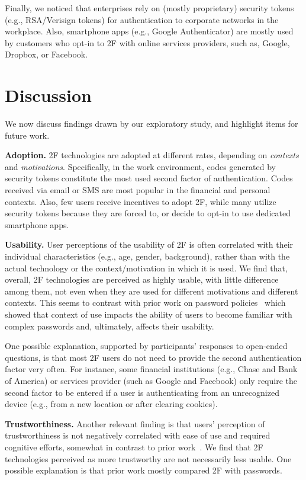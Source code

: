 \documentclass[conference]{IEEEtran}
\newcommand{\descr}[1]{\vspace{0.25cm} \noindent \textbf{#1}}
\begin{document}
Finally, we noticed that enterprises rely on (mostly proprietary) security tokens (e.g., RSA/Verisign tokens) for authentication to corporate networks in the workplace. Also, smartphone apps (e.g., Google Authenticator) are mostly used by customers who opt-in to 2F with online services providers, such as, Google, Dropbox, or Facebook.



\section{Discussion}\label{sec:discussion}



We now discuss findings drawn by our exploratory study, and highlight items for future work.

\descr{Adoption.} 2F technologies are adopted at different rates, depending on {\em contexts} and {\em motivations}. Specifically, in the work environment, codes generated by security tokens constitute the most used second factor of authentication. Codes received via email or SMS are most popular in the financial and personal contexts. Also, few users receive incentives to adopt 2F, while many utilize security tokens because they are forced to, or decide to opt-in to use dedicated smartphone apps. 

\descr{Usability.} User perceptions of the usability of 2F is often correlated with their individual characteristics (e.g., age, gender, background), rather than with the actual technology or the context/motivation in which it is used. We find that, overall, 2F technologies are perceived as highly usable, with little difference among them, not even when they are used for different motivations and different contexts. This seems to  contrast with prior work on password policies~\cite{inglesant2010true}
which showed that context of use impacts the ability of users to become 
familiar with complex passwords and, ultimately, affects their usability.

One possible explanation, supported by participants' responses to open-ended questions, is that 
most 2F users do not need to provide the second authentication factor very often. For instance, some financial institutions (e.g., Chase and Bank of America) or services provider (such as Google and Facebook) only require the second factor to be entered if a user is authenticating from an unrecognized device (e.g., from a new location or after clearing cookies).

\descr{Trustworthiness.} Another relevant finding is that users' perception of trustworthiness is not negatively correlated with ease of use and required cognitive efforts, somewhat in contrast to prior work~\cite{braz2006security,gunson2011user}. We find that 2F technologies perceived as more trustworthy are not necessarily less usable. One possible explanation is that prior work mostly compared 2F with passwords.
\end{document}
